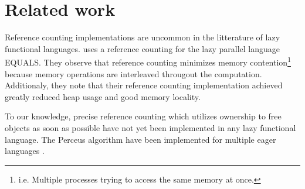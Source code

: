\documentclass[10pt, twocolumn]{article}
\begin{document}

\section{Related work}

Reference counting implementations are uncommon in the litterature of lazy functional languages.
\citet{kaser1992} uses a reference counting for the lazy parallel language EQUALS.
They observe that reference counting minimizes memory contention\footnote{i.e. Multiple processes trying to access the same memory at once.} because memory operations are interleaved througout the computation.
Additionaly, they note that their reference counting implementation achieved greatly reduced heap usage and good memory locality.

To our knowledge, precise reference counting which utilizes ownership to free objects as soon as possible have not yet been implemented in any lazy functional language.
The Perceus algorithm have been implemented for multiple eager languages \citep{reinking2021, ullrich2021, teeuwissen2023, pinto2023}.



\end{document}
